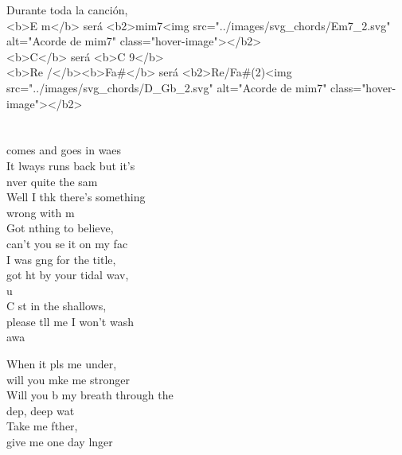 \begin{cancion}%
Durante toda la canción, \\
<b>E m</b> será <b2>mim7<img src="../images/svg_chords/Em7_2.svg" alt="Acorde de mim7" class="hover-image"></b2>\\
<b>C</b>  será <b>C 9</b>\\
<b>Re /</b><b>Fa#</b> será <b2>Re/Fa#(2)<img src="../images/svg_chords/D_Gb_2.svg" alt="Acorde de mim7" class="hover-image"></b2>\\
{}\vspace*{-0.4cm}\\
	           \\
	 comes and goes in waes\\
	It lways runs back but it's \\
	nver quite the sam\\
	Well I thk there's something \\
	wrong with m\\
	Got nthing to believe, \\
	can't you se it on my fac\\
	I was gng for the title, \\
	got ht by your tidal wav, \\
	u\\
	C st in the shallows, \\
	please tll me I won't wash\\
	 awa  \\
	\begin{chorus}%
	When it pls me under, \\
	will you mke me stronger\\
	Will you b my breath through the \\
	dep, deep wat\\
	Take me fther, \\
	give me one day lnger\\

\end{chorus}
\end{cancion}
